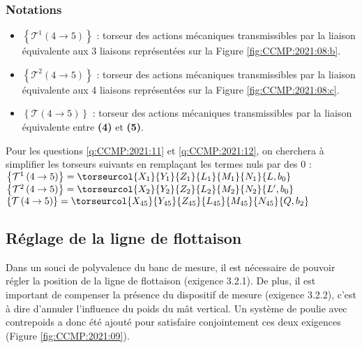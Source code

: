 \subsubsection*{Notations}
\begin{itemize}
    \item $\left\{ \mathcal{T}^1 \left(4\to 5 \right) \right\}$ : torseur des actions mécaniques transmissibles par la liaison équivalente aux 3 liaisons représentées sur la Figure \ref{fig:CCMP:2021:08:b}.
    \item $\left\{ \mathcal{T}^2 \left(4\to 5 \right) \right\}$ : torseur des actions mécaniques transmissibles par la liaison équivalente aux 4 liaisons représentées sur la Figure \ref{fig:CCMP:2021:08:c}.
    \item $\left\{ \mathcal{T} \left(4\to 5 \right) \right\}$ : torseur des actions mécaniques transmissibles par la liaison équivalente entre \textbf{(4)} et \textbf{(5)}.
\end{itemize}
Pour les questions \ref{q:CCMP:2021:11} et \ref{q:CCMP:2021:12}, on cherchera à simplifier les torseurs suivants en remplaçant les termes nuls par des 0 :
$\left\{ \mathcal{T}^1 \left(4\to 5 \right) \right\} = \torseurcol{X_1}{Y_1}{Z_1}{L_1}{M_1}{N_1}{L,b_0}$
$\left\{ \mathcal{T}^2 \left(4\to 5 \right) \right\} = \torseurcol{X_2}{Y_2}{Z_2}{L_2}{M_2}{N_2}{L',b_0}$
$\left\{ \mathcal{T} \left(4\to 5 \right) \right\} = \torseurcol{X_{45}}{Y_{45}}{Z_{45}}{L_{45}}{M_{45}}{N_{45}}{Q,b_2}$ 



\subsection{Réglage de la ligne de flottaison}
Dans un souci de polyvalence du banc de mesure, il est nécessaire de pouvoir régler la position de la ligne de flottaison (exigence 3.2.1). De plus, il est important de compenser la présence du dispositif de mesure (exigence 3.2.2), c'est à dire d'annuler l'influence du poids du mât vertical. Un système de poulie avec contrepoids a donc été ajouté pour satisfaire conjointement ces deux exigences (Figure \ref{fig:CCMP:2021:09}).

